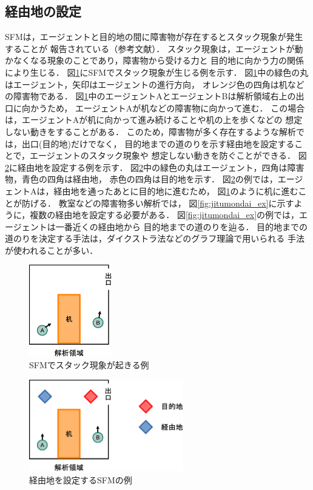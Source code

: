 \newpage
\subsection{経由地の設定}
SFMは，エージェントと目的地の間に障害物が存在するとスタック現象が発生することが
報告されている（参考文献）．
スタック現象は，エージェントが動かなくなる現象のことであり，障害物から受ける力と
目的地に向かう力の関係により生じる．
図\ref{fig:sutakku_ex}にSFMでスタック現象が生じる例を示す．
図\ref{fig:sutakku_ex}中の緑色の丸はエージェント，矢印はエージェントの進行方向，
オレンジ色の四角は机などの障害物である．
図\ref{fig:sutakku_ex}中のエージェントAとエージェントBは解析領域右上の出口に向かうため，
エージェントAが机などの障害物に向かって進む．
この場合は，エージェントAが机に向かって進み続けることや机の上を歩くなどの
想定しない動きをすることがある．
このため，障害物が多く存在するような解析では，出口(目的地)だけでなく，
目的地までの道のりを示す経由地を設定することで，エージェントのスタック現象や
想定しない動きを防ぐことができる．
図\ref{fig:keiyuti_ex}に経由地を設定する例を示す．
図\ref{fig:keiyuti_ex}中の緑色の丸はエージェント，四角は障害物，青色の四角は経由地，
赤色の四角は目的地を示す．
図\ref{fig:keiyuti_ex}の例では，エージェントAは，経由地を通ったあとに目的地に進むため，
図\ref{fig:sutakku_ex}のように机に進むことが防げる．
教室などの障害物多い解析では，
図\ref{fig:jitumondai_ex}に示すように，複数の経由地を設定する必要がある．
図\ref{fig:jitumondai_ex}の例では，エージェントは一番近くの経由地から
目的地までの道のりを辿る．
目的地までの道のりを決定する手法は，ダイクストラ法などのグラフ理論で用いられる
手法が使われることが多い\cite{keiro_daikusu}\cite{sfm_with_daikusutora}．

\begin{figure}[t]
 \begin{center}
  \includegraphics[height=4cm,clip]{figure/sutakku_ex.eps}
  \caption{SFMでスタック現象が起きる例}
  \label{fig:sutakku_ex}
 \end{center}
\end{figure}

\begin{figure}[t]
 \begin{center}
  \includegraphics[height=4cm,clip]{figure/keiyuti_ex.eps}
  \caption{経由地を設定するSFMの例}
  \label{fig:keiyuti_ex}
 \end{center}
\end{figure}

